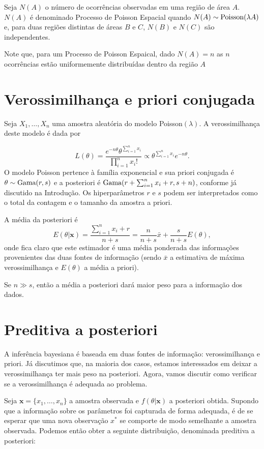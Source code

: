 \documentclass[
  letterpaper,
  DIV=11,
  numbers=noendperiod]{scrreprt}
\theoremstyle{definition}
\theoremstyle{definition}
\theoremstyle{plain}
\theoremstyle{remark}
\begin{document}
Seja \(N(A)\) o número de ocorrências observadas em uma região de área
\(A\). \(N(A)\) é denominado Processo de Poisson Espacial quando
\(N(A)\sim\hbox{Poisson}(\lambda A)\) e, para duas regiões distintas de
áreas \(B\) e \(C\), \(N(B)\) e \(N(C)\) são independentes.

Note que, para um Processo de Poisson Espaical, dado \(N(A)=n\) as \(n\)
ocorrências estão uniformemente distribuídas dentro da região \(A\)

\section{Verossimilhança e priori
conjugada}\label{verossimilhanuxe7a-e-priori-conjugada-1}

Seja \(X_1,\ldots,X_n\) uma amostra aleatória do modelo
Poisson\((\lambda)\). A verossimilhança deste modelo é dada por

\[L(\theta)=\frac{e^{-n\theta}\theta^{\sum_{i=1}^{n}x_i}}{\prod_{i=1}^{n}x_i!}\propto \theta^{\sum_{i=1}^n x_i}e^{-n\theta}.\]
O modelo Poisson pertence à família exponencial e sua priori conjugada é
\(\theta\sim\hbox{Gama}(r,s)\) e a posteriori é
\(\hbox{Gama}(r+\sum_{i=1}^n x_i+r, s+n)\), conforme já discutido na
Introdução. Os hiperparâmetros \(r\) e \(s\) podem ser interpretados
como o total da contagem e o tamanho da amostra a priori.

A média da posteriori é
\[E(\theta|\mathbf{x})=\frac{\sum_{i=1}^{n}x_i+r}{n+s}=\frac{n}{n+s}\bar{x}+\frac{s}{n+s}E(\theta),\]
onde fica claro que este estimador é uma média ponderada das informações
provenientes das duas fontes de informação (sendo \(\bar{x}\) a
estimativa de máxima verossimilhança e \(E(\theta)\) a média a priori).

Se \(n\gg s\), então a média a posteriori dará maior peso para a
informação dos dados.

\section{Preditiva a posteriori}\label{preditiva-a-posteriori-1}

A inferência bayesiana é baseada em duas fontes de informação:
verossimilhança e priori. Já discutimos que, na maioria dos casos,
estamos interessados em deixar a verossimilhança ter mais peso na
posteriori. Agora, vamos discutir como verificar se a verossimilhança é
adequada ao problema.

Seja \(\boldsymbol{x}=\{x_1,\ldots,x_n\}\) a amostra observada e
\(f(\theta|\boldsymbol{x})\) a posteriori obtida. Supondo que a
informação sobre os parâmetros foi capturada de forma adequada, é de se
esperar que uma nova observação \(x^*\) se comporte de modo semelhante a
amostra observada. Podemos então obter a seguinte distribuição,
denominada preditiva a posteriori:
\end{document}
